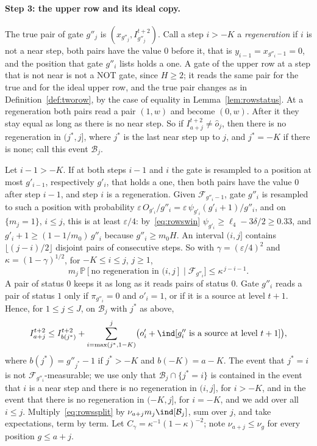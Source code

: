 \documentclass[11pt]{amsart}
\theoremstyle{definition}
\theoremstyle{remark}
\newcommand{\eps}{\varepsilon}
\newcommand{\PP}{\mathbb{P}}
\newcommand{\cF}{\mathcal{F}}
\begin{document}
\paragraph{Step 3: the upper row and its ideal copy.}
The true pair of gate $g''_j$ is $(x_{g''_j},I^{t+2}_{g''_j})$. Call a step $i>-K$ a
\emph{regeneration} if $i$ is not a near step, both pairs have the value $0$ before it, that is
$y_{i-1}=x_{g''_i-1}=0$, and the position that gate $g''_i$ lists holds a one. A gate of the upper
row at a step that is not near is not a NOT gate, since $H\ge2$; it reads the same pair for the
true and for the ideal upper row, and the true pair changes as in Definition~\ref{def:tworow}, by
the case of equality in Lemma~\ref{lem:rowstatus}. At a regeneration both pairs read a pair $(1,w)$
and become $(0,w)$. After it they stay equal as long as there is no near step. So if $I^{t+2}_{a+j}\ne\hat o_j$, then
there is no regeneration in $(j^*,j]$, where $j^*$ is the last near step up to $j$, and
$j^*=-K$ if there is none; call this event $\mathcal B_j$.

Let $i-1>-K$. If at both steps $i-1$ and $i$ the gate is resampled to a position at most $g'_{i-1}$,
respectively $g'_i$, that holds a one, then both pairs have the value $0$ after step $i-1$, and
step $i$ is a regeneration. Given $\cF_{g''_i-1}$, gate $g''_i$ is resampled to such a position
with probability $\eps\,O_{g'_i}/g''_i=\eps\,\psi_{g'_i}(g'_i+1)/g''_i$, and on $\{m_j=1\}$,
$i\le j$, this is at least $\eps/4$: by~\eqref{eq:rowswin} $\psi_{g'_i}\ge\ell_4-3\delta/2\ge0.33$,
and $g'_i+1\ge(1-1/m_0)\,g''_i$ because $g''_i\ge m_0H$. An interval $(i,j]$ contains
$\lfloor(j-i)/2\rfloor$ disjoint pairs of consecutive steps. So with $\gamma=(\eps/4)^2$ and
$\kappa=(1-\gamma)^{1/2}$, for $-K\le i\le j$, $j\ge1$,
\begin{equation}\label{eq:rowsregen}
m_j\,\PP[\text{no regeneration in }(i,j]\mid\cF_{g''_i}]\le\kappa^{\,j-i-1}.
\end{equation}
A pair of status $0$ keeps it as long as it reads pairs of status $0$. Gate $g''_i$ reads a pair of
status $1$ only if $\pi_{g''_i}=0$ and $o'_i=1$, or if it is a source at level $t+1$. Hence, for
$1\le j\le J$, on $\mathcal B_j$ with $j^*$ as above,
\begin{equation}\label{eq:rowssplit}
I^{t+2}_{a+j}\le I^{t+2}_{b(j^*)}+\sum_{i=\max(j^*,1-K)}^{j}\bigl(o'_i+\ind[g''_i\text{ is a source at level }t+1]\bigr),
\end{equation}
where $b(j^*)=g''_{j^*}-1$ if $j^*>-K$ and $b(-K)=a-K$. The event that $j^*=i$ is not
$\cF_{g''_i}$-measurable; we use only that $\mathcal B_j\cap\{j^*=i\}$ is contained in the event
that $i$ is a near step and there is no regeneration in $(i,j]$, for $i>-K$, and in the event that
there is no regeneration in $(-K,j]$, for $i=-K$, and we add over all $i\le j$. Multiply~\eqref{eq:rowssplit} by $\nu_{a+j}m_j\ind[\mathcal B_j]$,
sum over $j$, and take expectations, term by term. Let $C_\gamma=\kappa^{-1}(1-\kappa)^{-2}$; note $\nu_{a+j}\le\nu_g$ for every position $g\le a+j$.
\end{document}
